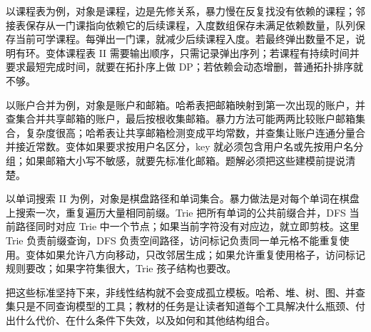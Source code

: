 以课程表为例，对象是课程，边是先修关系，暴力慢在反复找没有依赖的课程；邻接表保存从一门课指向依赖它的后续课程，入度数组保存未满足依赖数量，队列保存当前可学课程。每弹出一门课，就减少后续课程入度。若最终弹出数量不足，说明有环。变体课程表 II 需要输出顺序，只需记录弹出序列；若课程有持续时间并要求最短完成时间，就要在拓扑序上做 DP；若依赖会动态增删，普通拓扑排序就不够。

以账户合并为例，对象是账户和邮箱。哈希表把邮箱映射到第一次出现的账户，并查集合并共享邮箱的账户，最后按根收集邮箱。暴力方法可能两两比较账户邮箱集合，复杂度很高；哈希表让共享邮箱检测变成平均常数，并查集让账户连通分量合并接近常数。变体如果要求按用户名区分，key 就必须包含用户名或先按用户名分组；如果邮箱大小写不敏感，就要先标准化邮箱。题解必须把这些建模前提说清楚。

以单词搜索 II 为例，对象是棋盘路径和单词集合。暴力做法是对每个单词在棋盘上搜索一次，重复遍历大量相同前缀。Trie 把所有单词的公共前缀合并，DFS 当前路径同时对应 Trie 中一个节点；如果当前字符没有对应边，就立即剪枝。这里 Trie 负责前缀查询，DFS 负责空间路径，访问标记负责同一单元格不能重复使用。变体如果允许八方向移动，只改邻居生成；如果允许重复使用格子，访问标记规则要改；如果字符集很大，Trie 孩子结构也要改。

把这些标准坚持下来，非线性结构就不会变成孤立模板。哈希、堆、树、图、并查集只是不同查询模型的工具；教材的任务是让读者知道每个工具解决什么瓶颈、付出什么代价、在什么条件下失效，以及如何和其他结构组合。
